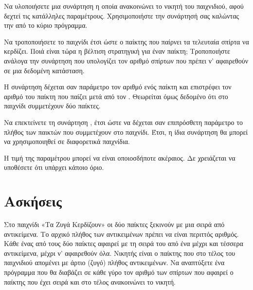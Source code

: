 \documentclass[a4paper,11pt,oneside]{book}
\begin{document}
{{{\begin{exercise}
Να υλοποιήσετε μια συνάρτηση η οποία ανακοινώνει το νικητή του παιχνιδιού, αφού δεχτεί τις κατάλληλες παραμέτρους. Χρησιμοποιήστε την συνάρτησή σας καλώντας την από το κύριο πρόγραμμα.
\end{exercise}

\begin{exercise}
Να τροποποιήσετε το παιχνίδι έτσι ώστε ο παίκτης που παίρνει τα τελευταία σπίρτα να κερδίζει. Ποιά είναι τώρα η βέλτιση στρατηγική για έναν παίκτη; Τροποποιήστε ανάλογα την συνάρτηση  που υπολογίζει τον αριθμό σπίρτων που πρέπει ν' αφαιρεθούν σε μια δεδομένη κατάσταση.
\end{exercise}


\begin{exercise}
Η συνάρτηση  δέχεται σαν παράμετρο τον αριθμό  ενός παίκτη και επιστρέφει τον αριθμό του παίκτη που παίζει μετά από τον . Θεωρείται όμως δεδομένο ότι στο παιχνίδι συμμετέχουν δύο παίκτες. 

Να επεκτείνετε τη συνάρτηση , έτσι ώστε να δέχεται σαν επιπρόσθετη παράμετρο το πλήθος  των παικτών που συμμετέχουν στο παιχνίδι. Έτσι, η ίδια συνάρτηση θα μπορεί να χρησιμοποιηθεί σε διαφορετικά παιχνίδια.

\begin{note}
Η τιμή της παραμέτρου  μπορεί να είναι οποιοσδήποτε ακέραιος. Δε χρειάζεται να υποθέσετε ότι υπάρχει κάποιο όριο.
\end{note}
\end{exercise}

\section{Ασκήσεις}


\begin{exercise}
Στο παιχνίδι «Τα Ζυγά Κερδίζουν» οι δύο παίκτες ξεκινούν με μια σειρά από αντικείμενα. Το αρχικό πλήθος των αντικειμένων πρέπει να είναι περιττός αριθμός. Κάθε ένας από τους δύο παίκτες αφαιρεί με τη σειρά του από ένα μέχρι και τέσσερα αντικείμενα, μέχρι ν' αφαιρεθούν όλα. Νικητής είναι ο παίκτης που στο τέλος του παιχνιδιού απομένει με άρτιο (ζυγό) πλήθος αντικειμένων. Να αναπτύξετε ένα πρόγραμμα που θα διαβάζει σε κάθε γύρο τον αριθμό των σπίρτων που αφαιρεί ο παίκτης που έχει σειρά και στο τέλος ανακοινώνει το νικητή.
\end{exercise}

}}}
\end{document}
